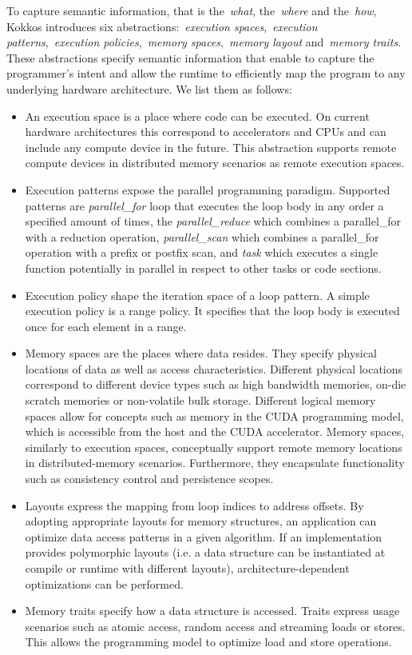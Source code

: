 To capture semantic information, that is the~\emph{what}, the~\emph{where} and the~\emph{how}, Kokkos introduces six abstractions:~\emph{execution spaces},~\emph{execution patterns},~\emph{execution policies},~\emph{memory spaces},~\emph{memory layout} and~\emph{memory traits}. These abstractions specify semantic information that enable to capture the programmer's intent and allow the runtime to efficiently map the program to any underlying hardware architecture. We list them as follows:
\begin{itemize}
	\item  An execution space is a place where code can be executed. On current hardware architectures this correspond to accelerators and CPUs and can include any compute device in the future. This abstraction supports remote compute devices in distributed memory scenarios as remote execution spaces.
	\item Execution patterns expose the parallel programming paradigm. Supported patterns are \emph{parallel\_for} loop that executes the loop body in any order a specified amount of times, the \emph{parallel\_reduce} which combines a parallel\_for with a reduction operation, \emph{parallel\_scan} which combines a parallel\_for operation with a prefix or postfix scan, and \emph{task} which executes a single function potentially in parallel in respect to other tasks or code sections. 
	\item Execution policy shape the iteration space of a loop pattern. A simple execution policy is a range policy. It specifies that the loop body is executed once for each element in a range.
	\item Memory spaces are the places where data resides. They specify physical locations of data as well as access characteristics. Different physical locations correspond to different device types such as high bandwidth memories, on-die scratch memories or non-volatile bulk storage. Different logical memory spaces allow for concepts such as memory in the CUDA programming model, which is accessible from the host and the CUDA accelerator. Memory spaces, similarly to execution spaces, conceptually support remote memory locations in distributed-memory scenarios. Furthermore, they encapsulate functionality such as consistency control and persistence scopes.
	\item Layouts express the mapping from loop indices to address offsets. By adopting appropriate layouts for memory structures, an application can optimize data access patterns in a given algorithm. If an implementation provides polymorphic layouts (i.e. a data structure can be instantiated at compile or runtime with different layouts), architecture-dependent optimizations can be performed.
	\item Memory traits specify how a data structure is accessed. Traits express usage scenarios such as atomic access, random access and streaming loads or stores. This allows the programming model to  optimize load and store operations.
\end{itemize}

